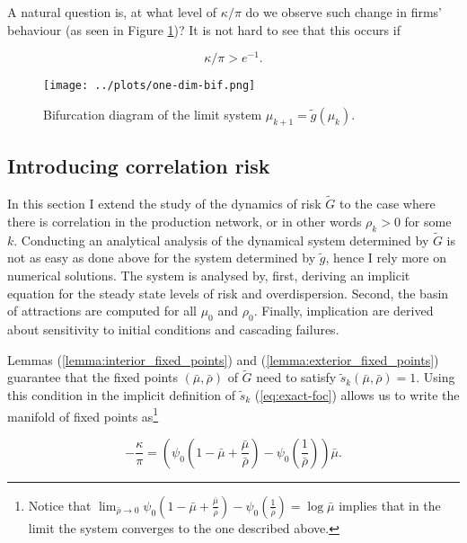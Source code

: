 \documentclass[../../main.tex]{subfiles}
\begin{document}
A natural question is, at what level of $\kappa / \pi$ do we observe such change in firms' behaviour (as seen in Figure \ref{fig:one-dimensional-bifurcation})? It is not hard to see that this occurs if 

\begin{equation}
  \kappa / \pi > e^{-1}.
\end{equation}


\begin{figure}[H]
  \centering
  \texttt{[image: ../plots/one-dim-bif.png]}
  \caption{Bifurcation diagram of the limit system $\mu_{k + 1} = \tilde{g}(\mu_k)$.}
  \label{fig:one-dimensional-bifurcation}
\end{figure}

\subsection{Introducing correlation risk}

In this section I extend the study of the dynamics of risk $\tilde{G}$ to the case where there is correlation in the production network, or in other words $\rho_k > 0$ for some $k$. Conducting an analytical analysis of the dynamical system determined by $\tilde{G}$ is not as easy as done above for the system determined by $\tilde{g}$, hence I rely more on numerical solutions. The system is analysed by, first, deriving an implicit equation for the steady state levels of risk and overdispersion. Second, the basin of attractions are computed for all $\mu_0$ and $\rho_0$. Finally, implication are derived about sensitivity to initial conditions and cascading failures.

Lemmas (\ref{lemma:interior_fixed_points}) and (\ref{lemma:exterior_fixed_points}) guarantee that the fixed points $(\bar{\mu}, \bar{\rho})$ of $\tilde{G}$ need to satisfy $\tilde{s}_k(\bar{\mu}, \bar{\rho})= 1$. Using this condition in the implicit definition of $\tilde{s}_k$ (\ref{eq:exact-foc}) allows us to write the manifold of fixed points as\footnote{Notice that $\lim_{\bar{\rho} \to 0} \psi_0\left(1 - \bar{\mu} + \frac{ \bar{\mu} }{\bar{\rho}} \right) - \psi_0\left(\frac{1}{\bar{\rho}} \right)= \log \bar{\mu} $ implies that in the limit the system converges to the one described above.}

\begin{equation}
  -\frac{\kappa}{\pi} = \left( \psi_0\left(1 - \bar{\mu} + \frac{ \bar{\mu} }{\bar{\rho}} \right) - \psi_0\left(\frac{1}{\bar{\rho}} \right) \right) \bar{\mu}.
\end{equation}
\end{document}
